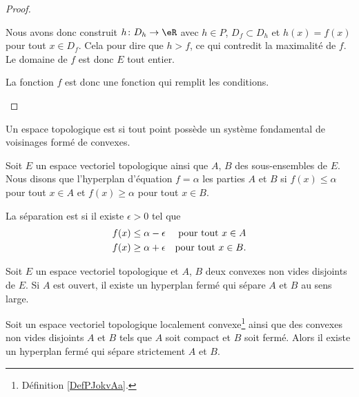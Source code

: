 \begin{proof}
\begin{subproof}
        Nous avons donc construit \( h\colon D_h\to \eR\) avec \( h\in P\), \( D_f\subset D_h\) et \( h(x)=f(x)\) pour tout \( x\in D_f\). Cela pour dire que \( h>f\), ce qui contredit la maximalité de \( f\). Le domaine de \( f\) est donc \( E\) tout entier.

        La fonction \( f\) est donc une fonction qui remplit les conditions.

    \end{subproof}
\end{proof}

\begin{definition}  \label{DefPJokvAa}
    Un espace topologique est  si tout point possède un système fondamental de voisinages formé de convexes.
\end{definition}

\begin{definition}
    Soit \( E\) un espace vectoriel topologique ainsi que \( A\), \( B\) des sous-ensembles de \( E\). Nous disons que l'hyperplan d'équation \( f=\alpha\)  les parties \( A\) et \( B\) si \( f(x)\leq \alpha\) pour tout \( x\in A\) et \( f(x)\geq \alpha\) pour tout \( x\in B\).

    La séparation est  si il existe \( \epsilon>0\) tel que 
    \begin{subequations}
        \begin{align}
            f(x)\leq \alpha-\epsilon&&\text{pour tout \( x\in A\)}\\
            f(x)\geq \alpha+\epsilon&&\text{pour tout \( x\in B\)}.
        \end{align}
    \end{subequations}
\end{definition}

\begin{theorem}  \label{ThoSAJjdZc}
    Soit \( E\) un espace vectoriel topologique et \( A\), \( B\) deux convexes non vides disjoints de \( E\). Si \( A\) est ouvert, il existe un hyperplan fermé qui sépare \( A\) et \( B\) au sens large.
\end{theorem}

\begin{theorem} \label{ThoACuKgtW}
    Soit un espace vectoriel topologique localement convexe\footnote{Définition \ref{DefPJokvAa}.} ainsi que des convexes non vides disjoints \( A\) et \( B\) tels que \( A\) soit compact et \( B\) soit fermé. Alors il existe un hyperplan fermé qui sépare strictement \( A\) et \( B\).
\end{theorem}


